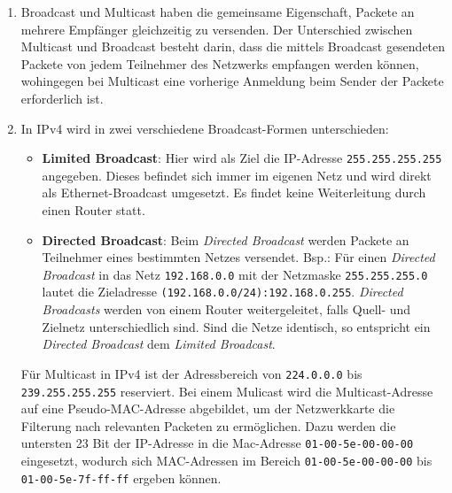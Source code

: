 \documentclass[german,12pt,a4paper]{article}
\begin{document}
\begin{enumerate}

	\item Broadcast und Multicast haben die gemeinsame Eigenschaft, Packete an mehrere Empfänger gleichzeitig zu versenden. 
	Der Unterschied zwischen Multicast und Broadcast besteht darin, dass die mittels Broadcast 
	gesendeten Packete von jedem Teilnehmer des Netzwerks empfangen werden können, wohingegen bei 
	Multicast eine vorherige Anmeldung beim Sender der Packete erforderlich ist.
	 
	\item In IPv4 wird in zwei verschiedene Broadcast-Formen unterschieden:
		\begin{itemize}
			\item \textbf{Limited Broadcast}: Hier wird als Ziel die IP-Adresse \texttt{255.255.255.255} angegeben. Dieses befindet sich 
			immer im eigenen Netz und wird direkt als Ethernet-Broadcast umgesetzt. Es findet keine Weiterleitung durch einen Router 
			statt.
			\item \textbf{Directed Broadcast}: Beim \textit{Directed Broadcast} werden Packete an Teilnehmer eines bestimmten Netzes versendet.
			Bsp.: Für einen \textit{Directed Broadcast} in das Netz \texttt{192.168.0.0} mit der Netzmaske \texttt{255.255.255.0} lautet die Zieladresse 
			\texttt{(192.168.0.0/24):192.168.0.255}. \textit{Directed Broadcasts} werden von einem Router weitergeleitet, falls Quell- und 
			Zielnetz unterschiedlich sind. Sind die Netze identisch, so entspricht ein \textit{Directed Broadcast} dem \textit{Limited Broadcast}.
		\end{itemize}
		
		
		Für Multicast in IPv4 ist der Adressbereich von \texttt{224.0.0.0} bis \texttt{239.255.255.255} reserviert. Bei einem 
		Mulicast wird die Multicast-Adresse auf eine Pseudo-MAC-Adresse abgebildet, um der Netzwerkkarte die Filterung nach relevanten 
		Packeten zu ermöglichen. Dazu werden die untersten 23 Bit der IP-Adresse in die Mac-Adresse \texttt{01-00-5e-00-00-00} eingesetzt, 
		wodurch sich MAC-Adressen im Bereich \texttt{01-00-5e-00-00-00} bis \texttt{01-00-5e-7f-ff-ff} ergeben können.
		


\end{enumerate}
\end{document}
